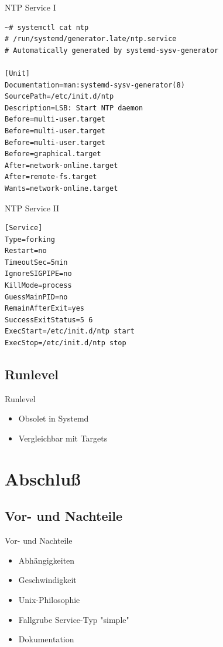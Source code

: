 \begin{frame}[fragile]{NTP Service I}
\begin{lstlisting}
~# systemctl cat ntp
# /run/systemd/generator.late/ntp.service
# Automatically generated by systemd-sysv-generator

[Unit]
Documentation=man:systemd-sysv-generator(8)
SourcePath=/etc/init.d/ntp
Description=LSB: Start NTP daemon
Before=multi-user.target
Before=multi-user.target
Before=multi-user.target
Before=graphical.target
After=network-online.target
After=remote-fs.target
Wants=network-online.target
\end{lstlisting}
\end{frame}

\begin{frame}[fragile]{NTP Service II}
\begin{lstlisting}
[Service]
Type=forking
Restart=no
TimeoutSec=5min
IgnoreSIGPIPE=no
KillMode=process
GuessMainPID=no
RemainAfterExit=yes
SuccessExitStatus=5 6
ExecStart=/etc/init.d/ntp start
ExecStop=/etc/init.d/ntp stop
\end{lstlisting}
\end{frame}

\subsection{Runlevel}

\begin{frame}{Runlevel}
\begin{itemize}
\item Obsolet in Systemd
\item Vergleichbar mit Targets
\end{itemize}	
\end{frame}

\section{Abschluß}
\subsection{Vor- und Nachteile}

\begin{frame}{Vor- und Nachteile}
\begin{itemize}
\item[\goodsmile] Abhängigkeiten
\item[\goodsmile] Geschwindigkeit
\item[\neutralsmile] Unix-Philosophie	
\item[\sadsmile] Fallgrube Service-Typ "simple"
\item[\sadsmile] Dokumentation
\end{itemize}
\end{frame}

